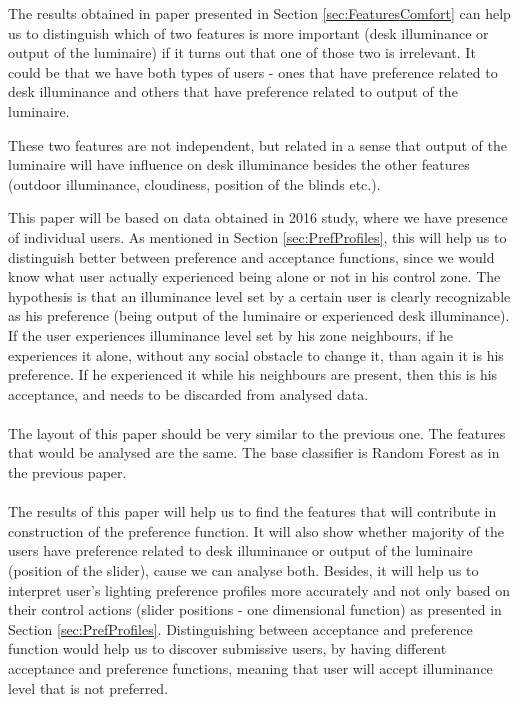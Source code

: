 \documentclass[a4paper]{article}
\begin{document}
The results obtained in paper presented in Section \ref{sec:FeaturesComfort} can help us to distinguish which of two features is more important (desk illuminance or output of the luminaire) if it turns out that one of those two is irrelevant. It could be that we have both types of users - ones that have preference related to desk illuminance and others that have preference related to output of the luminaire.

These two features are not independent, but related in a sense that output of the luminaire will have influence on desk illuminance besides the other features (outdoor illuminance, cloudiness, position of the blinds etc.). 

This paper will be based on data obtained in 2016 study, where we have presence of individual users. As mentioned in Section \ref{sec:PrefProfiles}, this will help us to distinguish better between preference and acceptance functions, since we would know what user actually experienced being alone or not in his control zone. The hypothesis is that an illuminance level set by a certain user is clearly recognizable as his preference (being output of the luminaire or experienced desk illuminance). If the user experiences illuminance level set by his zone neighbours, if he experiences it alone, without any social obstacle to change it, than again it is his preference. If he experienced it while his neighbours are present, then this is his acceptance, and needs to be discarded from analysed data.   
\\\\
\indent The layout of this paper should be very similar to the previous one.  The features that would be analysed are the same. The base classifier is Random Forest as in the previous paper.
\\\\
\indent The results of this paper will help us to find the features that will contribute in construction of the preference function. It will also show whether majority of the users have preference related to desk illuminance or output of the luminaire (position of the slider), cause we can analyse both. Besides, it will help us to interpret user's lighting preference profiles more accurately and not only based on their control actions (slider positions - one dimensional function) as presented in Section \ref{sec:PrefProfiles}. Distinguishing between acceptance and preference function would help us to discover submissive users, by having different acceptance and preference functions, meaning that user will accept illuminance level that is not preferred.
\end{document}
